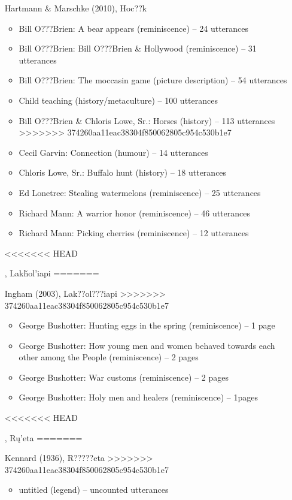 \documentclass[output=paper]{LSP/langsci}
\begin{document}
\begin{description}
\begin{itemize}
\item[Hartmann \& Marschke (2010), Hoc??k]\hfill
\begin{itemize}
\item Bill O???Brien: A bear appears (reminiscence) -- 24 utterances
\item Bill O???Brien: Bill O???Brien \& Hollywood (reminiscence) -- 31 utterances
\item Bill O???Brien: The moccasin game (picture description) -- 54 utterances
\item Child teaching (history/metaculture) -- 100 utterances
\item Bill O???Brien \& Chloris Lowe, Sr.: Horses (history) -- 113 utterances
>>>>>>> 374260aa11eac38304f850062805c954c530b1e7
\item Cecil Garvin: Connection (humour) -- 14 utterances
\item Chloris Lowe, Sr.: Buffalo hunt (history) -- 18 utterances
\item Ed Lonetree: Stealing watermelons (reminiscence) -- 25 utterances
\item Richard Mann: A warrior honor (reminiscence) -- 46 utterances
\item Richard Mann: Picking cherries (reminiscence) -- 12 utterances
\end{itemize}

<<<<<<< HEAD
\item[\citet{Ingham2003}, Lakȟol’iapi]\hfill
=======
\item[Ingham (2003), Lak??ol???iapi]\hfill
>>>>>>> 374260aa11eac38304f850062805c954c530b1e7
\begin{itemize}
\item George Bushotter: Hunting eggs in the spring (reminiscence) -- 1 page
\item George Bushotter: How young men and women behaved towards each other among the People (reminiscence) -- 2 pages
\item George Bushotter: War customs (reminiscence) -- 2 pages
\item George Bushotter: Holy men and healers (reminiscence) -- 1\textonehalf{}pages
\end{itemize}

<<<<<<< HEAD
\item[\citet{Kennard1936}, Rų’eta]\hfill
=======
\item[Kennard (1936), R?????eta]\hfill
>>>>>>> 374260aa11eac38304f850062805c954c530b1e7
\begin{itemize}
\item untitled (legend) -- uncounted utterances
\end{itemize}


\end{itemize}
\end{description}
\end{document}
